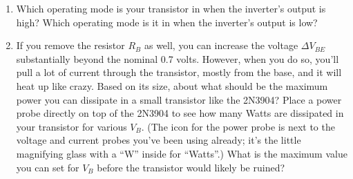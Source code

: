 \begin{enumerate}[wide]
\item Which operating mode is your transistor in when the inverter's output is high?  Which operating mode is it in when  the inverter's output is low?  

\item If you remove the resistor $R_B$ as well, you can increase the voltage $\Delta V_{BE}$ substantially beyond the nominal 0.7 volts.  However, when you do so, you'll pull a lot of current through the transistor, mostly from the base, and it will heat up like crazy.  Based on its size, about what should be the maximum power you can dissipate in a small transistor like the 2N3904?  Place a power probe directly on top of the 2N3904 to see how many Watts are dissipated in your transistor for various $V_B$.  (The icon for the power probe  is next to the voltage and current probes you've been using already; it's the little magnifying glass with a ``W'' inside for ``Watts''.)  What is the maximum value you can set for $V_B$ before the transistor would likely be ruined?


\end{enumerate}









